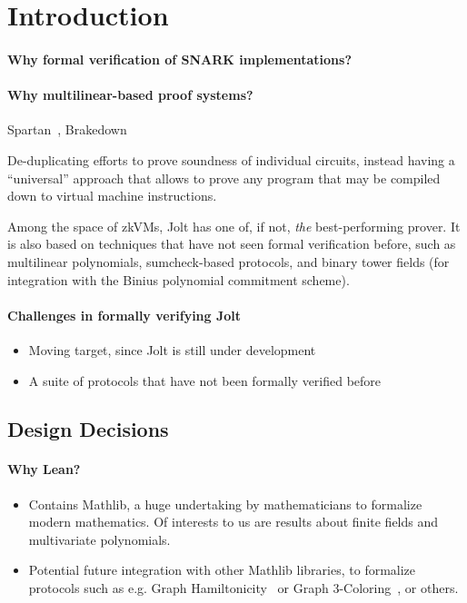 \section{Introduction}\label{sec:intro}

\paragraph{Why formal verification of SNARK implementations?}

\paragraph{Why multilinear-based proof systems?}

Spartan~\cite{C:Setty20}, Brakedown

De-duplicating efforts to prove soundness of individual circuits, instead having a ``universal'' approach that allows to prove any program that may be compiled down to virtual machine instructions.

Among the space of zkVMs, Jolt has one of, if not, \emph{the} best-performing prover. It is also based on techniques that have not seen formal verification before, such as multilinear polynomials, sumcheck-based protocols, and binary tower fields (for integration with the Binius polynomial commitment scheme).

\paragraph{Challenges in formally verifying Jolt}

\begin{itemize}
    \item Moving target, since Jolt is still under development
    \item A suite of protocols that have not been formally verified before
\end{itemize}

\subsection{Design Decisions}


\paragraph{Why Lean?}

\begin{itemize}
    \item Contains Mathlib, a huge undertaking by mathematicians to formalize modern mathematics. Of interests to us are results about finite fields and multivariate polynomials.
    \item Potential future integration with other Mathlib libraries, to formalize protocols such as e.g. Graph Hamiltonicity~\cite{blum...} or Graph 3-Coloring~\cite{...}, or others.
\end{itemize}

